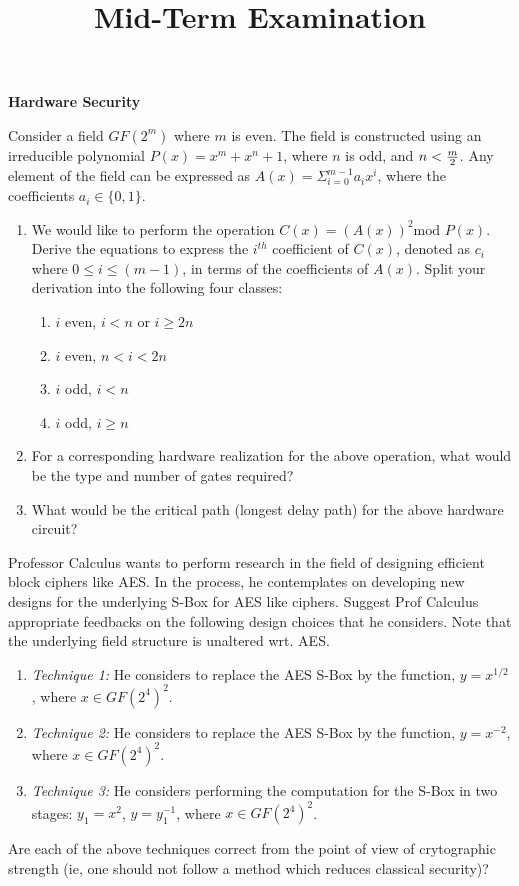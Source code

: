 \documentclass{article}
\title{Mid-Term Examination}
\begin{document}
\begin{center}
  \large{\bf Hardware Security\\[5mm]
    }
\end{center}

\begin{questions}
\question Consider a field $GF(2^m)$ where $m$ is even. The field is constructed using an irreducible polynomial $P(x)=x^m+x^n+1$, where $n$ is odd, and $n < {m \over 2}$. Any element of the field can be expressed as $A(x)=\Sigma_{i=0}^{m-1}a_ix^i$, where the coefficients $a_i \in \{0,1\}$.  

\begin{enumerate}
\item We would like to perform the operation $C(x)=(A(x))^2 \mbox{mod }P(x)$. Derive the equations to express the $i^{th}$ coefficient of $C(x)$, denoted as $c_i$ where $0 \leq i \leq (m-1)$, in terms of the coefficients of $A(x)$. Split your derivation into the following four classes:
\begin{enumerate}
\item $i$ even, $i < n$ or $i \geq 2n$
\item $i$ even, $n < i < 2n$
\item $i$ odd, $i < n$
\item $i$ odd, $i \geq n$
\end{enumerate}

\item For a corresponding hardware realization for the above operation, what would be the type and number of gates required?
 
\item What would be the critical path (longest delay path) for the above hardware circuit? 
\end{enumerate}

\question Professor Calculus wants to perform research in the field of designing efficient block ciphers like AES. In the process, he contemplates on developing new designs for the underlying S-Box for AES like ciphers. Suggest Prof Calculus appropriate feedbacks on the following design choices that he considers. Note that the underlying field structure is unaltered wrt. AES.
\begin{enumerate}
\item {\em Technique 1:} He considers to replace the AES S-Box by the function, $y=x^{1/2}$, where $x \in GF(2^4)^2$. 
\item {\em Technique 2:} He considers to replace the AES S-Box by the function, $y=x^{-2}$,  where $x \in GF(2^4)^2$.  
\item {\em Technique 3:} He considers performing the computation for the 
S-Box in two stages: 
$y_1=x^2$, $y=y_1^{-1}$,  where $x \in GF(2^4)^2$.  
\end{enumerate} 
Are each of the above techniques correct from the point of view of crytographic strength (ie, one should not follow a method which reduces classical security)?


\end{questions}
\end{document}
